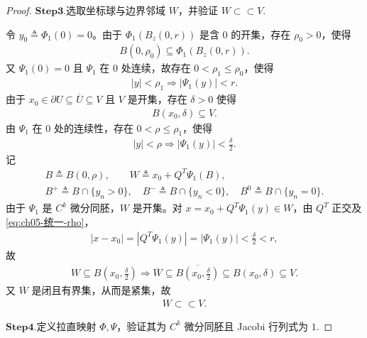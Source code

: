 \documentclass[../../main.tex]{subfiles}
\begin{document}
\begin{proof}
\noindent$\mathbf{Step}\bm{3}$.{\heiti 选取坐标球与边界邻域 $W$，并验证 $W\subset\subset V$.}

令 $y_0\triangleq\Phi_1(0)=0$。由于 $\Phi_1(B_z(0,r))$ 是含 $0$ 的开集，存在 $\rho_0>0$，使得
\begin{align*}
B(0,\rho_0)\subseteq\Phi_1(B_z(0,r)).
\end{align*}
又 $\Psi_1(0)=0$ 且 $\Psi_1$ 在 $0$ 处连续，故存在 $0<\rho_1\leqslant\rho_0$，使得
\begin{align}
|y|<\rho_1\Longrightarrow|\Psi_1(y)|<r.
\label{eq:ch05-统一-rho1}
\end{align}
由于 $x_0\in\partial U\subseteq\overline{U}\subseteq V$ 且 $V$ 是开集，存在 $\delta>0$ 使得
\begin{align}
B(x_0,\delta)\subseteq V.
\label{eq:ch05-统一-delta}
\end{align}
由 $\Psi_1$ 在 $0$ 处的连续性，存在 $0<\rho\leqslant\rho_1$，使得
\begin{align}
|y|<\rho\Longrightarrow|\Psi_1(y)|<\frac{\delta}{2}.
\label{eq:ch05-统一-rho}
\end{align}
记
\begin{gather*}
B\triangleq B(0,\rho),\qquad
W\triangleq x_0+Q^{T}\Psi_1(B),\\
B^{+}\triangleq B\cap\{y_n>0\},\quad
B^{-}\triangleq B\cap\{y_n<0\},\quad
B^{0}\triangleq B\cap\{y_n=0\}.
\end{gather*}
由于 $\Psi_1$ 是 $C^{k}$ 微分同胚，$W$ 是开集。对 $x=x_0+Q^{T}\Psi_1(y)\in W$，由 $Q^{T}$ 正交及 \eqref{eq:ch05-统一-rho}，
\begin{align*}
|x-x_0|=|Q^{T}\Psi_1(y)|=|\Psi_1(y)|<\frac{\delta}{2}<r,
\end{align*}
故
\begin{align}
W\subseteq B\left( x_0,\frac{\delta}{2} \right)\Longrightarrow \overline{W}\subseteq\overline{B\left(x_0,\frac{\delta}{2}\right)}
\subseteq B(x_0,\delta)\subseteq V.
\label{eq:ch05-统一-W紧含}
\end{align}
又 $\overline{W}$ 是闭且有界集，从而是紧集，故
\begin{align}
W\subset\subset V.
\label{eq:ch05-统一-W紧含2}
\end{align}

\noindent$\mathbf{Step}\bm{4}$.{\heiti 定义拉直映射 $\Phi,\Psi$，验证其为 $C^{k}$ 微分同胚且 Jacobi 行列式为 $1$.}


\end{proof}
\end{document}
